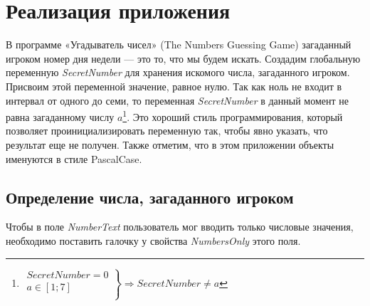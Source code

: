 \section{Реализация приложения}
\label{styles}
В программе «Угадыватель чисел» (The Numbers Guessing Game)\cite{PanfilovaApp} загаданный игроком номер дня недели — это то, что мы будем искать.
Создадим глобальную переменную  \textit{SecretNumber} для хранения искомого числа, загаданного игроком. Присвоим этой переменной значение, равное нулю. 
Так как ноль не входит в интервал от одного до семи, то переменная \textit{SecretNumber} в данный момент не равна загаданному числу $ a $\footnote[][-0cm]{\mbox{$ \left.\begin{array}{ccc}
  SecretNumber = 0 \\
  a \in [1;7] \\
\end{array}
\right\}\Rightarrow SecretNumber \neq a $}}. Это хороший стиль программирования, который позволяет проинициализировать переменную так, чтобы явно указать, что результат еще не получен. Также
отметим, что в этом приложении объекты именуются в стиле PascalCase\cite{Chase2018}.

\subsection{Определение числа, загаданного игроком}
Чтобы в поле \textit{NumberText} пользователь мог вводить только числовые значения, необходимо поставить галочку у свойства \textit{NumbersOnly} этого поля.

